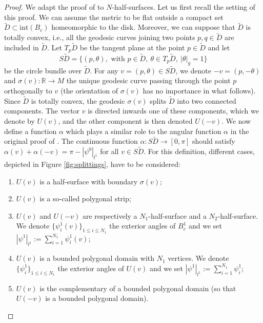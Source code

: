 \documentclass{article}
\newcommand{\R}{\mathbb{R}}
\newcommand{\surf}{M}
\newcommand{\halfP}{B}
\theoremstyle{remark}
\theoremstyle{prpart}
\begin{document}
\begin{proof}
We adapt the proof of \cite[Thm.3]{Bur05} to $N$-half-surfaces. Let us first recall the setting of this proof. We can assume the metric to be flat outside a compact set $\tilde D\subset \text{int} (\halfP_c)$ homeomorphic to the disk. Moreover, we can suppose that $\tilde D$ is totally convex, i.e., all the geodesic curves joining two points $p,q\in\tilde D$ are included in $\tilde D$. Let $T_p\tilde D$ be the tangent plane at the point $p\in\tilde D$ and let
\begin{equation*}
  S\tilde D = \big\{(p,\theta), \text{ with }p\in \tilde D,~\theta\in T_p\tilde D,~ |\theta|_g=1\big\}
\end{equation*}
be the circle bundle over $\tilde D$.
For any $v=(p,\theta) \in S\tilde D$, we denote $-v=(p,-\theta)$ and $\sigma(v):\R\to\surf$ the unique geodesic curve passing through the point $p$ orthogonally to $v$ (the orientation of $\sigma(v)$ has no importance in what follows). Since $\tilde D$ is totally convex, the geodesic $\sigma(v)$ splits $\tilde D$ into two connected components. The vector $v$ is directed inwards one of these components, which we denote by $U(v)$, and the other component is then denoted $U(-v)$. We now define a function $\alpha$ which plays a similar role to the angular function $\alpha$ in the original proof of \cite[Thm.3]{Bur05}. The continuous function $\alpha:S\tilde D\to [0,\pi]$ should satisfy $\alpha(v)+\alpha(-v)=\pi-|\psi^0|_{l^1}$ for all $v\in S\tilde D$. For this definition, different cases, depicted in Figure \ref{fig:splittings}, have to be considered:
\begin{enumerate}%
  \item \label{case-a} $U(v)$ is a half-surface with boundary $\sigma(v)$;
  \item \label{case-b} $U(v)$ is a so-called polygonal strip;
  \item \label{case-c} $U(v)$ and $U(-v)$ are respectively a $N_1$-half-surface and a $N_2$-half-surface. We denote $\{\psi_i^1(v)\}_{1\leq i\leq N_1}$ the exterior angles of $\halfP_c^1$ and we set $|\psi^1|_{l^1}:= \sum_{i=1}^{N_1}\psi_i^1(v)$;
  \item \label{case-d} $U(v)$ is a bounded polygonal domain with $N_1$ vertices. We denote $\{\psi_i^1\}_{1\leq i\leq N_1}$ the exterior angles of $U(v)$ and we set $|\psi^1|_{l^1}:=\sum_{i=1}^{N_1}\psi_i^1$;
  \item \label{case-e} $U(v)$ is the complementary of a bounded polygonal domain (so that $U(-v)$ is a bounded polygonal domain).

\end{enumerate}
\end{proof}
\end{document}
